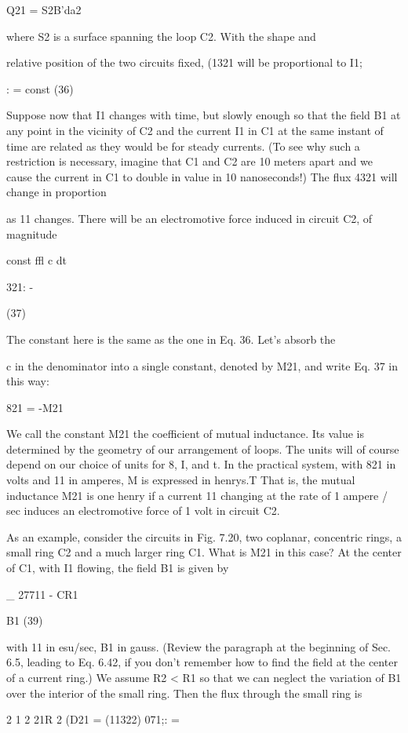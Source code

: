 Q21 = S2B'da2 

where S2 is a surface spanning the loop C2. With the shape and

relative position of the two circuits fixed, (1321 will be proportional
to I1;

: = const (36)

Suppose now that I1 changes with time, but slowly enough so that
the field B1 at any point in the vicinity of C2 and the current I1 in C1
at the same instant of time are related as they would be for steady
currents. (To see why such a restriction is necessary, imagine that C1
and C2 are 10 meters apart and we cause the current in C1 to double in
value in 10 nanoseconds!) The flux 4321 will change in proportion

as 11 changes. There will be an electromotive force induced in
circuit C2, of magnitude

const ffl
c dt

321: -

(37)

The constant here is the same as the one in Eq. 36. Let's absorb the

c in the denominator into a single constant, denoted by M21, and write
Eq. 37 in this way:

821 = -M21%

We call the constant M21 the coefficient of mutual inductance. Its
value is determined by the geometry of our arrangement of loops.
The units will of course depend on our choice of units for 8, I, and t.
In the practical system, with 821 in volts and 11 in amperes, M is expressed
in henrys.T That is, the mutual inductance M21 is one henry
if a current 11 changing at the rate of 1 ampere / sec induces an electromotive
force of 1 volt in circuit C2.

As an example, consider the circuits in Fig. 7.20, two coplanar,
concentric rings, a small ring C2 and a much larger ring C1. What
is M21 in this case? At the center of C1, with I1 flowing, the field B1
is given by

_ 27711
- CR1

B1 (39)

with 11 in esu/sec, B1 in gauss. (Review the paragraph at the beginning
of Sec. 6.5, leading to Eq. 6.42, if you don't remember how to
find the field at the center of a current ring.) We assume R2 < R1
so that we can neglect the variation of B1 over the interior of the small
ring. Then the flux through the small ring is

2 1 2 21R 2
(D21 = (11322) 071;: = %

